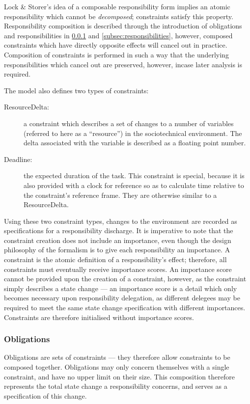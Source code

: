 Lock \& Storer's idea of a composable responsibility form implies an atomic responsibility which cannot be \emph{decomposed}; constraints satisfy this property. Responsibility composition is described through the introduction of obligations and responsibilities in \cref{subsec:obligations} and \cref{subsec:responsibilities}, however, composed constraints which have directly opposite effects will cancel out in practice. Composition of constraints is performed in such a way that the underlying responsibilities which cancel out are preserved, however, incase later analysis is required.\par

The model also defines two types of constraints:

\begin{description}
    \item [ResourceDelta: ] a constraint which describes a set of changes to a number of variables (referred to here as a ``resource'') in the sociotechnical environment. The delta associated with the variable is described as a floating point number.
    \item [Deadline: ] the expected duration of the task. This constraint is special, because it is also provided with a clock for reference so as to calculate time relative to the constraint's reference frame. They are otherwise similar to a ResourceDelta.
\end{description}

Using these two constraint types, changes to the environment are recorded as specifications for a responsibility discharge. It is imperative to note that the constraint creation does not include an importance, even though the design philosophy of the formalism is to give each responsibility an importance. A constraint is the atomic definition of a responsibility's effect; therefore, all constraints must eventually receive importance scores. An importance score cannot be provided upon the creation of a constraint, however, as the constraint simply describes a state change --- an importance score is a detail which only becomes necessary upon responsibility delegation, as different delegees may be required to meet the same state change specification with different importances. Constraints are therefore initialised without importance scores.\par

\subsubsection{Obligations}\label{subsec:obligations}  %
Obligations are sets of constraints --- they therefore allow constraints to be composed together. Obligations may only concern themselves with a single constraint, and have no upper limit on their size. This composition therefore represents the total state change a responsibility concerns, and serves as a specification of this change.\par

